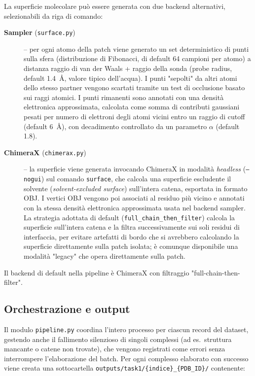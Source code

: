 \documentclass[11pt,a4paper]{article}
\begin{document}
La superficie molecolare può essere generata con due backend alternativi, selezionabili da riga di comando:

\begin{description}
    \item[\textbf{Sampler} (\texttt{surface.py})] -- per ogni atomo della patch viene generato un set deterministico di punti sulla sfera (distribuzione di Fibonacci, di default 64 campioni per atomo) a distanza raggio di van der Waals + raggio della sonda (probe radius, default 1.4~\r{A}, valore tipico dell'acqua). I punti "sepolti" da altri atomi dello stesso partner vengono scartati tramite un test di occlusione basato sui raggi atomici. I punti rimanenti sono annotati con una densità elettronica approssimata, calcolata come somma di contributi gaussiani pesati per numero di elettroni degli atomi vicini entro un raggio di cutoff (default 6~\r{A}), con decadimento controllato da un parametro $\alpha$ (default 1.8).
    \item[\textbf{ChimeraX} (\texttt{chimerax.py})] -- la superficie viene generata invocando ChimeraX in modalità \emph{headless} (\texttt{--nogui}) sul comando \texttt{surface}, che calcola una superficie escludente il solvente (\emph{solvent-excluded surface}) sull'intera catena, esportata in formato OBJ. I vertici OBJ vengono poi associati al residuo più vicino e annotati con la stessa densità elettronica approssimata usata nel backend sampler. La strategia adottata di default (\texttt{full\_chain\_then\_filter}) calcola la superficie sull'intera catena e la filtra successivamente sui soli residui di interfaccia, per evitare artefatti di bordo che si avrebbero calcolando la superficie direttamente sulla patch isolata; è comunque disponibile una modalità "legacy" che opera direttamente sulla patch.
\end{description}

Il backend di default nella pipeline è ChimeraX con filtraggio "full-chain-then-filter".

\subsection{Orchestrazione e output}
Il modulo \texttt{pipeline.py} coordina l'intero processo per ciascun record del dataset, gestendo anche il fallimento silenzioso di singoli complessi (ad es.\ struttura mancante o catene non trovate), che vengono registrati come errori senza interrompere l'elaborazione del batch. Per ogni complesso elaborato con successo viene creata una sottocartella \texttt{outputs/task1/\{indice\}\_\{PDB\_ID\}/} contenente:
\end{document}
